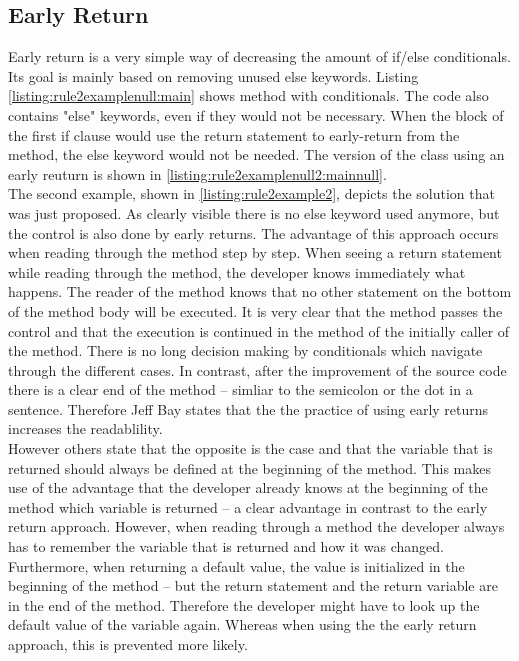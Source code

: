 \subsection*{Early Return}
Early return is a very simple way of decreasing the amount of if/else conditionals. Its goal is mainly based on removing unused else keywords. Listing \ref{listing:rule2examplenull:main} shows method with conditionals. The code also contains "else" keywords, even if they would not be necessary. When the block of the first if clause would use the return statement to early-return from the method, the else keyword would not be needed. The version of the class using an early reuturn is shown in \ref{listing:rule2examplenull2:mainnull}.
\\

The second example, shown in \ref{listing:rule2example2}, depicts the solution that was just proposed. As clearly visible there is no else keyword used anymore, but the control is also done by early returns. The advantage of this approach occurs when reading through the method step by step. When seeing a return statement while reading through the method, the developer knows immediately what happens. The reader of the method knows that no other statement on the bottom of the method body will be executed. It is very clear that the method passes the control and that the execution is continued in the method of the initially caller of the method. There is no long decision making by conditionals which navigate through the different cases. In contrast, after the improvement of the source code there is a clear end of the method -- simliar to the semicolon or the dot in a sentence. Therefore Jeff Bay states that the the practice of using early returns increases the  readablility. 
\\

However others state that the opposite is the case and that the variable that is returned should always be defined at the beginning of the method. This makes use of the advantage that the developer already knows at the beginning of the method which variable is returned -- a clear advantage in contrast to the early return approach. However, when reading through a method the developer always has to remember the variable that is returned and how it was changed. Furthermore, when returning a default value, the value is initialized in the beginning of the method -- but the return statement and the return variable are in the end of the method. Therefore the developer might have to look up the default value of the variable again. Whereas when using the the early return approach, this is prevented more likely.

